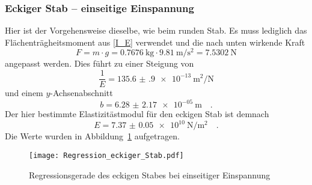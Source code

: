 \subsubsection{Eckiger Stab -- einseitige Einspannung}
Hier ist der Vorgehensweise dieselbe, wie beim runden Stab. Es muss lediglich das Flächenträgheitsmoment aus \eqref{I_E} verwendet und die nach unten wirkende Kraft
\begin{equation}
  F = m \cdot g = \SI{0.7676}{\kilo\gram} \cdot \SI{9.81}{\metre\per\second\squared} = \SI{7.5302}{\newton}
\end{equation}
angepasst werden.
Dies führt zu einer Steigung von
\begin{equation}
  \frac{1}{E}= \SI{135.6(9)e-13}{\metre\squared\per\newton}
\end{equation}
und einem $y$-Achsenabschnitt
\begin{equation}
  b = \SI{6.28(217)e-05}{\metre} \quad.
\end{equation}
Der hier bestimmte Elastizitästmodul für den eckigen Stab ist demnach
\begin{equation}
  E = \SI{7.37(5)e+10}{\newton\per\metre\squared} \quad.
\end{equation}
Die Werte wurden in Abbildung~\ref{fig:Regression_eckiger_Stab} aufgetragen.

\begin{figure}[h!]
\centering
\texttt{[image: Regression\_eckiger\_Stab.pdf]}
\caption{Regressionsgerade des eckigen Stabes bei einseitiger Einspannung}
\label{fig:Regression_eckiger_Stab}
\end{figure}






\clearpage

